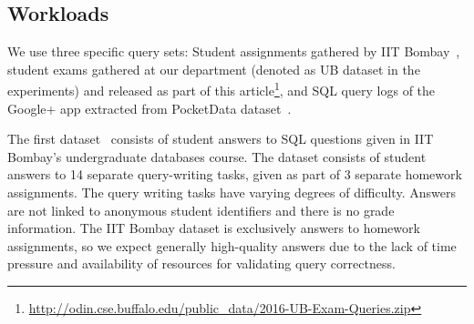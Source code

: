 \subsection{Workloads}
\label{subsec:data}
%
We use three specific query sets: Student assignments gathered by IIT Bombay~\cite{chandra2015Data}, student exams gathered at
our department (denoted as UB dataset in the experiments)
and released as part of this article\footnote{\url{http://odin.cse.buffalo.edu/public_data/2016-UB-Exam-Queries.zip}
}, and SQL query logs of the Google+ app extracted from PocketData dataset~\cite{pocketdata}.

The first dataset~\cite{chandra2015Data} consists of student answers to SQL questions given in IIT Bombay's undergraduate databases course.
The dataset consists of student answers to 14 separate query-writing tasks, given as part of 3 separate homework assignments.
The query writing tasks have varying degrees of difficulty.
Answers are not linked to anonymous student identifiers and there is no grade information.
The IIT Bombay dataset is exclusively answers to homework assignments, so we expect generally high-quality answers due to the lack of time pressure and availability of resources for validating query correctness.

